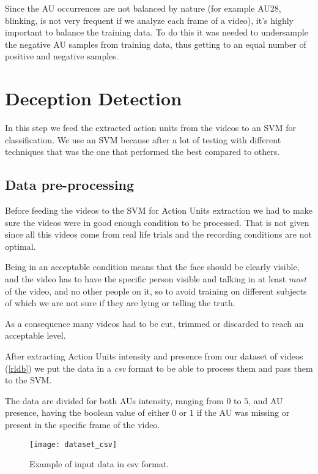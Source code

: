 Since the AU occurrences are not balanced by nature (for example AU28, blinking, is not very frequent if we analyze each frame of a video), it's highly important to balance the training data. To do this it was needed to undersample the negative AU samples from training data, thus getting to an equal number of positive and negative samples.

\clearpage

\section{Deception Detection} \label{dec_det}
In this step we feed the extracted action units from the videos to an SVM for classification.
We use an SVM because after a lot of testing with different techniques that was the one that performed the best compared to others. 

\subsection{Data pre-processing}
Before feeding the videos to the SVM for Action Units extraction we had to make sure the videos were in good enough condition to be processed. That is not given since all this videos come from real life trials and the recording conditions are not optimal.

Being in an acceptable condition means that the face should be clearly visible, and the video has to have the specific person visible and talking in at least \textit{most} of the video, and no other people on it, so to avoid training on different subjects of which we are not sure if they are lying or telling the truth.

As a consequence many videos had to be cut, trimmed or discarded to reach an acceptable level.

After extracting Action Units intensity and presence from our dataset of videos (\ref{rldb}) we put the data in a \textit{csv} format to be able to process them and pass them to the SVM. 

The data are divided for both AUs intensity, ranging from $0$ to $5$, and AU presence, having the boolean value of either $0$ or $1$ if the AU was missing or present in the specific frame of the video.

\begin{figure}[H]
	\centering
	\texttt{[image: dataset\_csv]}
	\caption{Example of input data in csv format.}
	\label{fig:dataset_csv}
\end{figure}

